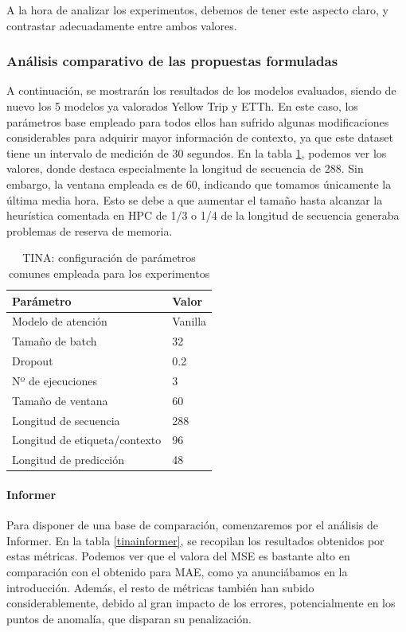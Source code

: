 A la hora de analizar los experimentos, debemos de tener este aspecto claro, y contrastar adecuadamente entre ambos valores.

\subsubsection{Análisis comparativo de las propuestas formuladas}

A continuación, se mostrarán los resultados de los modelos evaluados, siendo de nuevo los 5 modelos ya valorados Yellow Trip y ETTh. En este caso, los parámetros base empleado para todos ellos han sufrido algunas modificaciones considerables para adquirir mayor información de contexto, ya que este dataset tiene un intervalo de medición de 30 segundos. En la tabla \ref{ajustestina}, podemos ver los valores, donde destaca especialmente la longitud de secuencia de 288. Sin embargo, la ventana empleada es de 60, indicando que tomamos únicamente la última media hora. Esto se debe a que aumentar el tamaño hasta alcanzar la heurística comentada en HPC de 1/3 o 1/4 de la longitud de secuencia generaba problemas de reserva de memoria.

\begin{table}[!ht]
	\centering
	\begin{tabular}{l|l}
		\toprule
		Parámetro & Valor \\
		\midrule
		{Modelo de atención} & Vanilla \\
		{Tamaño de batch} & 32 \\
		{Dropout} & 0.2 \\
		{Nº de ejecuciones} & 3 \\
		{Tamaño de ventana} & 60 \\
		{Longitud de secuencia} & 288 \\
		{Longitud de etiqueta/contexto} & 96 \\
		{Longitud de predicción} & 48 \\
		\bottomrule
	\end{tabular}
	\caption{TINA: configuración de parámetros comunes empleada para los experimentos}
	\label{ajustestina}
\end{table}

\paragraph{Informer}

Para disponer de una base de comparación, comenzaremos por el análisis de Informer. En la tabla \ref{tinainformer}, se recopilan los resultados obtenidos por estas métricas. Podemos ver que el valora del MSE es bastante alto en comparación con el obtenido para MAE, como ya anunciábamos en la introducción. Además, el resto de métricas también han subido considerablemente, debido al gran impacto de los errores, potencialmente en los puntos de anomalía, que disparan su penalización.\\

